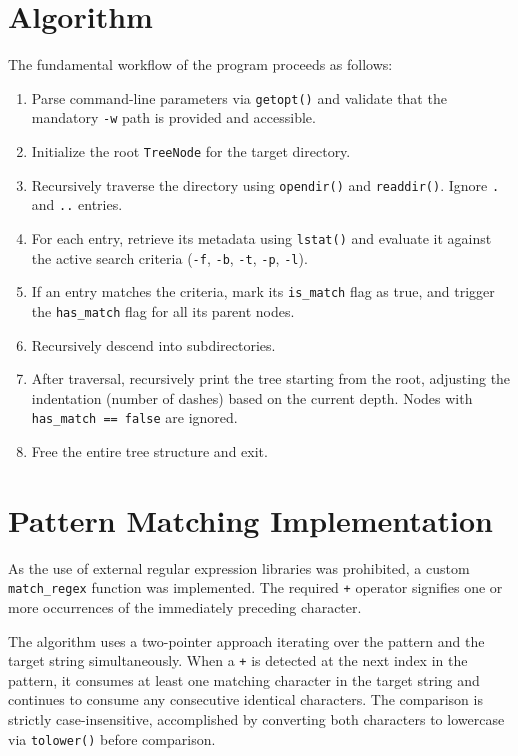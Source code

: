 \documentclass[12pt,a4paper]{article}
\begin{document}
\section{Algorithm}
The fundamental workflow of the program proceeds as follows:
\begin{enumerate}
    \item Parse command-line parameters via \texttt{getopt()} and validate that the mandatory \texttt{-w} path is provided and accessible.
    \item Initialize the root \texttt{TreeNode} for the target directory.
    \item Recursively traverse the directory using \texttt{opendir()} and \texttt{readdir()}. Ignore \texttt{.} and \texttt{..} entries.
    \item For each entry, retrieve its metadata using \texttt{lstat()} and evaluate it against the active search criteria (\texttt{-f}, \texttt{-b}, \texttt{-t}, \texttt{-p}, \texttt{-l}).
    \item If an entry matches the criteria, mark its \texttt{is\_match} flag as true, and trigger the \texttt{has\_match} flag for all its parent nodes.
    \item Recursively descend into subdirectories.
    \item After traversal, recursively print the tree starting from the root, adjusting the indentation (number of dashes) based on the current depth. Nodes with \texttt{has\_match == false} are ignored.
    \item Free the entire tree structure and exit.
\end{enumerate}

\section{Pattern Matching Implementation}
As the use of external regular expression libraries was prohibited, a custom \texttt{match\_regex} function was implemented. The required \texttt{+} operator signifies one or more occurrences of the immediately preceding character. 

The algorithm uses a two-pointer approach iterating over the pattern and the target string simultaneously. When a \texttt{+} is detected at the next index in the pattern, it consumes at least one matching character in the target string and continues to consume any consecutive identical characters. The comparison is strictly case-insensitive, accomplished by converting both characters to lowercase via \texttt{tolower()} before comparison.
\end{document}
